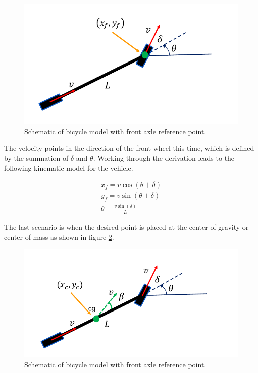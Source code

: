 \begin{figure}[!htb]
\begin{center}
\includegraphics[scale=0.290]{img/bicycle_model/bicycle_model_4.jpeg}
\end{center}
\caption{Schematic of bicycle model with front axle reference point.}
\label{bicycle_model_4}
\end{figure}


The velocity points in the direction of the front wheel this time, which is defined by the summation of $\delta$ and $\theta$. Working through the derivation leads to the following kinematic model for the vehicle. 

\begin{eqnarray}
\dot{x}_f = v\cos(\theta + \delta) \\
\dot{y}_f = v\sin(\theta + \delta) \\
\dot{\theta} = \frac{v\sin(\delta)}{L}
\end{eqnarray}

The last scenario is when the desired point is placed at the center of gravity or center of mass as shown in figure \ref{bicycle_model_5}. 



\begin{figure}[!htb]
\begin{center}
\includegraphics[scale=0.290]{img/bicycle_model/bicycle_model_5.jpeg}
\end{center}
\caption{Schematic of bicycle model with front axle reference point.}
\label{bicycle_model_5}
\end{figure}


